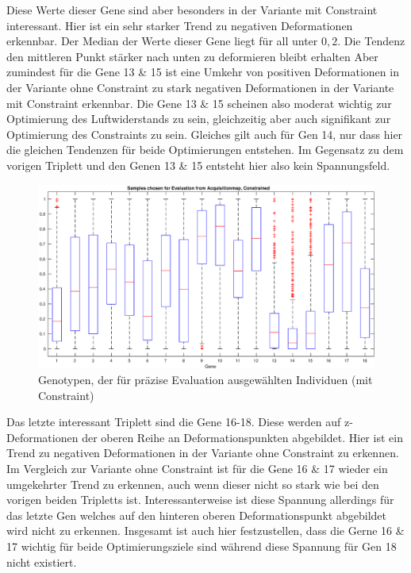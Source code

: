 Diese Werte dieser Gene sind aber besonders in der Variante mit Constraint interessant.
Hier ist ein sehr starker Trend zu negativen Deformationen erkennbar.
Der Median der Werte dieser Gene liegt für all unter $0,2$.
Die Tendenz den mittleren Punkt stärker nach unten zu deformieren bleibt erhalten
Aber zumindest für die Gene 13 \& 15 ist eine Umkehr von positiven Deformationen in der Variante ohne Constraint zu stark negativen Deformationen in der Variante mit Constraint erkennbar.
Die Gene 13 \& 15 scheinen also moderat wichtig zur Optimierung des Luftwiderstands zu sein, gleichzeitig aber auch signifikant zur Optimierung des Constraints zu sein.
Gleiches gilt auch für Gen 14, nur dass hier die gleichen Tendenzen für beide Optimierungen entstehen.
Im Gegensatz zu dem vorigen Triplett und den Genen 13 \& 15 entsteht hier also kein Spannungsfeld.

\begin{figure}[h]
	\centering
	\includegraphics[width=1\linewidth]{bilder/6pt1000Samples/acquisitionDiversityCon}
	\caption{Genotypen, der für präzise Evaluation ausgewählten Individuen (mit Constraint)}
	\label{fig:geneticDivCon}
\end{figure}

Das letzte interessant Triplett sind die Gene 16-18.
Diese werden auf z-Deformationen der oberen Reihe an Deformationspunkten abgebildet.
Hier ist ein Trend zu negativen Deformationen in der Variante ohne Constraint zu erkennen.
Im Vergleich zur Variante ohne Constraint ist für die Gene 16 \& 17 wieder ein umgekehrter Trend zu erkennen, auch wenn dieser nicht so stark wie bei den vorigen beiden Tripletts ist.
Interessanterweise ist diese Spannung allerdings für das letzte Gen welches auf den hinteren oberen Deformationspunkt abgebildet wird nicht zu erkennen.
Insgesamt ist auch hier festzustellen, dass die Gerne 16 \& 17 wichtig für beide Optimierungsziele sind während diese Spannung für Gen 18 nicht existiert.

